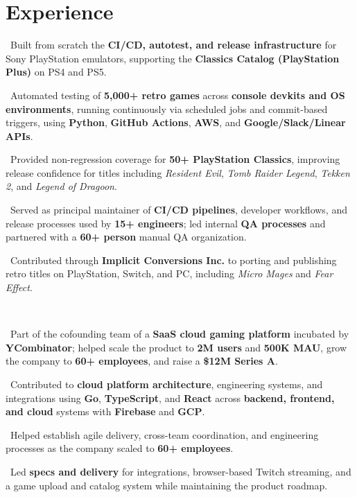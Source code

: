 \documentclass{muratcan_cv}
\newcommand{\tightbullet}[1]{\coloredbullet\ #1\par}
\renewcommand{\explanationdetail}[1]{%
    \indent \indent \begin{minipage}{0.87\linewidth} \fontsize{8.35pt}{9.7pt}\selectfont #1 \end{minipage} \\[0.03cm]
}
\begin{document}
\section{Experience}
\explanationdetail{
    \tightbullet{Built from scratch the \textbf{CI/CD, autotest, and release infrastructure} for Sony PlayStation emulators, supporting the \textbf{Classics Catalog (PlayStation Plus)} on PS4 and PS5.}
    \tightbullet{Automated testing of \textbf{5,000+ retro games} across \textbf{console devkits and OS environments}, running continuously via scheduled jobs and commit-based triggers, using \textbf{Python}, \textbf{GitHub Actions}, \textbf{AWS}, and \textbf{Google/Slack/Linear APIs}.}
    \tightbullet{Provided non-regression coverage for \textbf{50+ PlayStation Classics}, improving release confidence for titles including \textit{Resident Evil}, \textit{Tomb Raider Legend}, \textit{Tekken 2}, and \textit{Legend of Dragoon}.}
    \tightbullet{Served as principal maintainer of \textbf{CI/CD pipelines}, developer workflows, and release processes used by \textbf{15+ engineers}; led internal \textbf{QA processes} and partnered with a \textbf{60+ person} manual QA organization.}
    \tightbullet{Contributed through \textbf{Implicit Conversions Inc.} to porting and publishing retro titles on PlayStation, Switch, and PC, including \textit{Micro Mages} and \textit{Fear Effect}.}
}

\explanationdetail{
    \tightbullet{Part of the cofounding team of a \textbf{SaaS cloud gaming platform} incubated by \textbf{YCombinator}; helped scale the product to \textbf{2M users} and \textbf{500K MAU}, grow the company to \textbf{60+ employees}, and raise a \textbf{\$12M Series A}.}
    \tightbullet{Contributed to \textbf{cloud platform architecture}, engineering systems, and integrations using \textbf{Go}, \textbf{TypeScript}, and \textbf{React} across \textbf{backend, frontend, and cloud} systems with \textbf{Firebase} and \textbf{GCP}.}
    \tightbullet{Helped establish agile delivery, cross-team coordination, and engineering processes as the company scaled to \textbf{60+ employees}.}
    \tightbullet{Led \textbf{specs and delivery} for integrations, browser-based Twitch streaming, and a game upload and catalog system while maintaining the product roadmap.}
}
\end{document}
